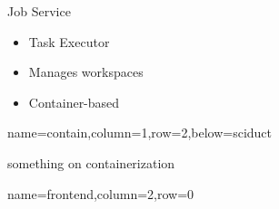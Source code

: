 \documentclass[landscape,paperwidth=70in,paperheight=46in,fontscale=0.225]{baposter} %
\begin{document}
\begin{poster}
{\begin{minipage}[t]{0.32\columnwidth}
\end{minipage}
\hfill
\noindent
\begin{minipage}[t]{0.32\columnwidth}
Job Service
\small{\begin{itemize}[leftmargin=*,noitemsep,topsep=0pt]
	\item Task Executor
	\item Manages workspaces
	\item Container-based 

\end{itemize}}

\end{minipage}
}


          {name=contain,column=1,row=2,below=sciduct}{
          
something on containerization
} 


          {name=frontend,column=2,row=0}{
          

}
\end{poster}
\end{document}
